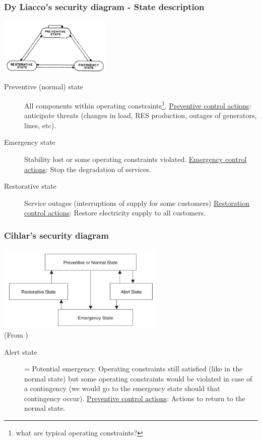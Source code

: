 \documentclass[compress]{beamer}
\newcommand*{\citec}[1]{(From \cite{#1})}
\begin{document}
\begin{frame}
  \frametitle{Dy Liacco's security diagram - State description}
\centering  \includegraphics[width=0.4\textwidth]{Figs/DyLiacco_SecurityDiagram.png}
\begin{description}
  \item[Preventive (normal) state] All components within operating constraints\footnote{what are typical operating constraints?}. \underline{Preventive control actions}: anticipate threats (changes in load, RES production, outages of generators, lines, etc).
  \item[Emergency state] Stability lost or some operating constraints violated. \underline{Emergency control actions}: Stop the degradation of services.
  \item[Restorative state] Service outages (interruptions of supply for some customers) \underline{Restoration control actions}: Restore electricity supply to all customers.
  \end{description}
\end{frame}

\begin{frame}
\frametitle{Cihlar's security diagram}
\centering
\includegraphics[width=0.6\textwidth]{Figs/Cihlar_SecurityDiagram.png}\\
\citec{Cihlar1969Electric}
\begin{description}
\item[Alert state] = Potential emergency. Operating constraints still satisfied (like in the normal state) but some operating constraints would be violated in case of a contingency (we would go to the emergency state should that contingency occur). \underline{Preventive control actions}: Actions to return to the normal state.
\end{description}
\end{frame}
\end{document}
